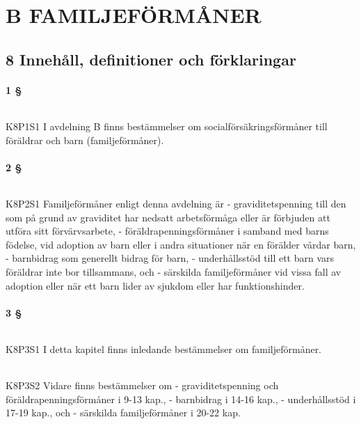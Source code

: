 \documentclass[a4paper,notitlepage,openany,10pt]{book}
\begin{document}
\part*{B FAMILJEFÖRMÅNER}
\chapter*{8 Innehåll, definitioner och förklaringar}
\subsection*{1 §}
\paragraph*{}
{\tiny K8P1S1}
I avdelning B finns bestämmelser om socialförsäkringsförmåner till föräldrar och barn (familjeförmåner).
\subsection*{2 §}
\paragraph*{}
{\tiny K8P2S1}
Familjeförmåner enligt denna avdelning är
\newline - graviditetspenning till den som på grund av graviditet har nedsatt arbetsförmåga eller är förbjuden att utföra sitt förvärvsarbete,
\newline - föräldrapenningsförmåner i samband med barns födelse, vid adoption av barn eller i andra situationer när en förälder vårdar barn,
\newline - barnbidrag som generellt bidrag för barn,
\newline - underhållsstöd till ett barn vars föräldrar inte bor tillsammans, och
\newline - särskilda familjeförmåner vid vissa fall av adoption eller när ett barn lider av sjukdom eller har funktionshinder.
\subsection*{3 §}
\paragraph*{}
{\tiny K8P3S1}
I detta kapitel finns inledande bestämmelser om familjeförmåner.
\paragraph*{}
{\tiny K8P3S2}
Vidare finns bestämmelser om
\newline - graviditetspenning och föräldrapenningsförmåner i 9-13 kap.,
\newline - barnbidrag i 14-16 kap.,
\newline - underhållsstöd i 17-19 kap., och
\newline - särskilda familjeförmåner i 20-22 kap.
\end{document}
